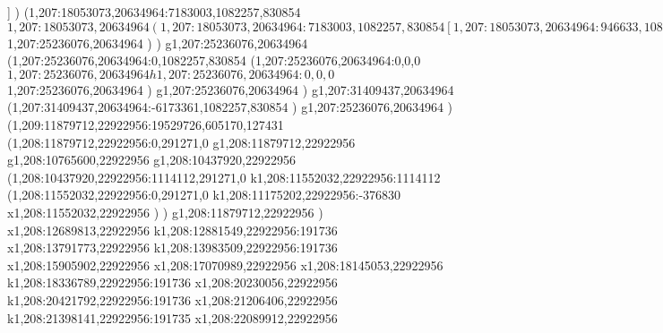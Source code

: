 {]
)
(1,207:18053073,20634964:7183003,1082257,830854
$1,207:18053073,20634964
(1,207:18053073,20634964:7183003,1082257,830854
[1,207:18053073,20634964:946633,1082257,830854
(1,207:18053073,19815761:946633,197518,0
k1,207:18265155,19815761:212082
x1,207:18787624,19815761
k1,207:18999706,19815761:212082
)
(1,207:18053073,20634964:946633,688132,360452
(1,207:18053073,20012368:946633,65536,983048
x1,207:18999706,20012368
)
)
(1,207:18053073,21400282:946633,295640,0
k1,207:18095625,21400282:42552
x1,207:18957154,21400282
k1,207:18999706,21400282:42552
)
]
g1,207:19108930,20634964
x1,207:19529680,20634964
g1,207:19729927,20634964
(1,207:19729927,20634964:3685713,753669,425990
(1,207:19729927,19907508:436908,26213,1153446
x1,207:20166835,19907508
)
[1,207:20166835,20634964:361814,610631,0
(1,207:20183902,20462021:0,437688,0
x1,207:20511583,20462021
)
(1,207:20166835,20634964:361814,455111,0
x1,207:20508018,20634964
)
]
x1,207:20783512,20634964
[1,207:20783512,20634964:800538,605170,0
(1,207:20904570,20467482:0,437688,0
x1,207:21232251,20467482
)
(1,207:20783512,20634964:800538,552762,0
x1,207:21353308,20634964
(1,207:21353308,20364371:230742,282169,0
x1,207:21551282,20364371
)
)
]
x1,207:21838913,20634964
g1,207:22020953,20634964
x1,207:22530679,20634964
g1,207:22712719,20634964
x1,207:22978732,20634964
(1,207:22978732,19907508:436908,26213,1153446
x1,207:23415640,19907508
)
)
g1,207:23597680,20634964
x1,207:24107406,20634964
g1,207:24289446,20634964
x1,207:24944807,20634964
g1,207:25054031,20634964
x1,207:25236076,20634964
)
$1,207:25236076,20634964
)
)
g1,207:25236076,20634964
(1,207:25236076,20634964:0,1082257,830854
(1,207:25236076,20634964:0,0,0
$1,207:25236076,20634964
h1,207:25236076,20634964:0,0,0
$1,207:25236076,20634964
)
g1,207:25236076,20634964
)
g1,207:31409437,20634964
(1,207:31409437,20634964:-6173361,1082257,830854
)
g1,207:25236076,20634964
)
(1,209:11879712,22922956:19529726,605170,127431
(1,208:11879712,22922956:0,291271,0
g1,208:11879712,22922956
g1,208:10765600,22922956
g1,208:10437920,22922956
(1,208:10437920,22922956:1114112,291271,0
k1,208:11552032,22922956:1114112
(1,208:11552032,22922956:0,291271,0
k1,208:11175202,22922956:-376830
x1,208:11552032,22922956
)
)
g1,208:11879712,22922956
)
x1,208:12689813,22922956
k1,208:12881549,22922956:191736
x1,208:13791773,22922956
k1,208:13983509,22922956:191736
x1,208:15905902,22922956
x1,208:17070989,22922956
x1,208:18145053,22922956
k1,208:18336789,22922956:191736
x1,208:20230056,22922956
k1,208:20421792,22922956:191736
x1,208:21206406,22922956
k1,208:21398141,22922956:191735
x1,208:22089912,22922956
}

